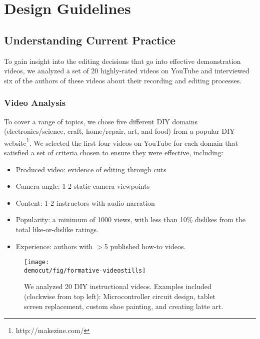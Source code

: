 
\section{Design Guidelines}
\subsection{Understanding Current Practice}
To gain insight into the editing decisions that go into effective
demonstration videos, we analyzed a set of 20 highly-rated videos
on YouTube and interviewed six of the authors of these videos about
their recording and editing processes.

\subsubsection{Video Analysis}
To cover a range of topics, we chose
five different DIY domains (electronics/science,
  craft, home/repair, art, and food) from a popular DIY website\footnote{http://makezine.com/}. We selected the first four videos on YouTube for each domain that satisfied a set of criteria chosen to ensure they were effective, including:

\begin{itemize}
  \setlength{\itemsep}{0pt}
  \item Produced video: evidence of editing through cuts %
  \item Camera angle: 1-2 static camera viewpoints %
  \item Content: 1-2 instructors with audio narration
  \item Popularity: a minimum of 1000 views, with less than 10\% dislikes from the total like-or-dislike ratings.
  \item Experience: authors with $>$5 published how-to videos.
\end{itemize}

\begin{figure}[t]
  \centering
\texttt{[image: \\democut/fig/formative-videostills]}
  \caption{We analyzed 20 DIY instructional videos. Examples included (clockwise from top left): Microcontroller circuit design, tablet screen replacement, custom shoe painting, and creating latte art.}
  \label{fig:formative}
  \vspace{-0.25in}
\end{figure}

